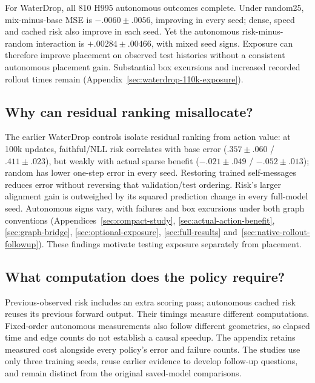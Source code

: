 For WaterDrop, all 810 H995 autonomous outcomes complete. Under random25, mix-minus-base MSE is $-.0060\pm.0056$, improving in every seed; dense, speed and cached risk also improve in each seed. Yet the autonomous risk-minus-random interaction is $+.00284\pm.00466$, with mixed seed signs. Exposure can therefore improve placement on observed test histories without a consistent autonomous placement gain. Substantial box excursions and increased recorded rollout times remain (Appendix~\ref{sec:waterdrop-110k-exposure}).

\subsection{Why can residual ranking misallocate?}
The earlier WaterDrop controls isolate residual ranking from action value: at 100k updates, faithful/NLL risk correlates with base error ($.357\pm.060$ / $.411\pm.023$), but weakly with actual sparse benefit ($-.021\pm.049$ / $-.052\pm.013$); random has lower one-step error in every seed. Restoring trained self-messages reduces error without reversing that validation/test ordering. Risk's larger alignment gain is outweighed by its squared prediction change in every full-model seed. Autonomous signs vary, with failures and box excursions under both graph conventions (Appendices~\ref{sec:compact-study}, \ref{sec:actual-action-benefit}, \ref{sec:graph-bridge}, \ref{sec:optional-exposure}, \ref{sec:full-results} and~\ref{sec:native-rollout-followup}). These findings motivate testing exposure separately from placement.

\subsection{What computation does the policy require?}
Previous-observed risk includes an extra scoring pass; autonomous cached risk reuses its previous forward output. Their timings measure different computations. Fixed-order autonomous measurements also follow different geometries, so elapsed time and edge counts do not establish a causal speedup. The appendix retains measured cost alongside every policy's error and failure counts. The studies use only three training seeds, reuse earlier evidence to develop follow-up questions, and remain distinct from the original saved-model comparisons.
